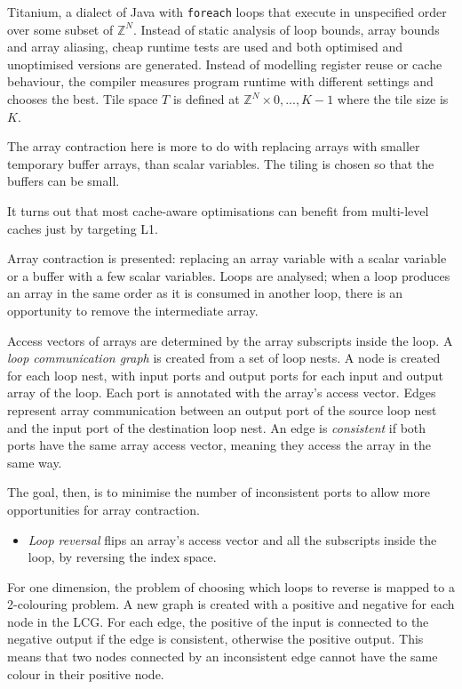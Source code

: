 Titanium, a dialect of Java with {\tt foreach} loops that execute in unspecified order over some subset of $\mathbb{Z}^N$.
Instead of static analysis of loop bounds, array bounds and array aliasing, cheap runtime tests are used
and both optimised and unoptimised versions are generated.
Instead of modelling register reuse or cache behaviour, the compiler measures program runtime with different settings and chooses the best.
Tile space $T$ is defined at $\mathbb{Z}^N \times {0, ... , K - 1}$ where the tile size is $K$.

The array contraction here is more to do with replacing arrays with smaller temporary buffer arrays, than scalar variables.
The tiling is chosen so that the buffers can be small.

It turns out that most cache-aware optimisations can benefit from multi-level caches just by targeting L1.

Array contraction is presented: replacing an array variable with a scalar variable or a buffer with a few scalar variables.
Loops are analysed; when a loop produces an array in the same order as it is consumed in another loop, there is an opportunity to
remove the intermediate array.

Access vectors of arrays are determined by the array subscripts inside the loop.
A \emph{loop communication graph} is created from a set of loop nests. A node is created for each loop nest, with input ports and output ports for each input and output array of the loop. Each port is annotated with the array's access vector.
Edges represent array communication between an output port of the source loop nest and the input port of the destination loop nest.
An edge is \emph{consistent} if both ports have the same array access vector, meaning they access the array in the same way.

The goal, then, is to minimise the number of inconsistent ports to allow more opportunities for array contraction.
\begin{itemize}
\item
\emph{Loop reversal} flips an array's access vector and all the subscripts inside the loop, by reversing the index space.
\end{itemize}
For one dimension, the problem of choosing which loops to reverse is mapped to a 2-colouring problem.
A new graph is created with a positive and negative for each node in the LCG. For each edge, the positive of the input is connected to the negative output if the edge is consistent, otherwise the positive output.
This means that two nodes connected by an inconsistent edge cannot have the same colour in their positive node.

